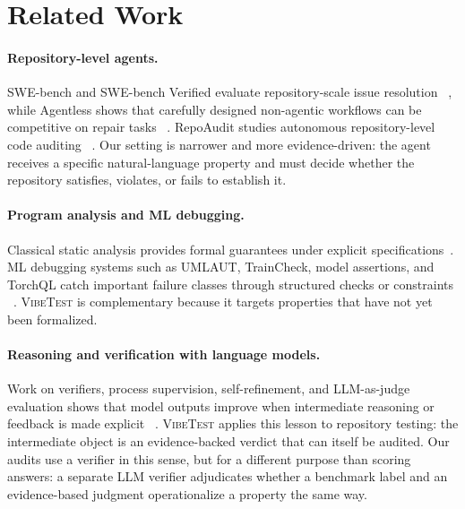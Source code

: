 \documentclass[11pt]{article}
\newcommand{\vibetest}{\textsc{VibeTest}}
\begin{document}
\section{Related Work}

\paragraph{Repository-level agents.}
SWE-bench and SWE-bench Verified evaluate repository-scale issue resolution
~\citep{jimenez2024swebench,swebench-verified}, while Agentless shows that
carefully designed non-agentic workflows can be competitive on repair tasks
~\citep{xia2024agentless}.
RepoAudit studies autonomous repository-level code auditing
~\citep{guo2025repoaudit}.
Our setting is narrower and more evidence-driven: the agent receives a specific
natural-language property and must decide whether the repository satisfies,
violates, or fails to establish it.

\paragraph{Program analysis and ML debugging.}
Classical static analysis provides formal guarantees under explicit
specifications~\citep{cousot1979systematic,nielson1999principles}.
ML debugging systems such as UMLAUT, TrainCheck, model assertions, and TorchQL
catch important failure classes through structured checks or constraints
~\citep{schoop2021umlaut,traincheck,kang2020assertions,naik2024torchql}.
\vibetest{} is complementary because it targets properties that have not yet
been formalized.

\paragraph{Reasoning and verification with language models.}
Work on verifiers, process supervision, self-refinement, and LLM-as-judge
evaluation shows that model outputs improve when intermediate reasoning or
feedback is made explicit
~\citep{cobbe2021verifier,lightman2024process,madaan2023selfrefine,weng2023selfverification,zheng2023judge,tan2025judgebench}.
\vibetest{} applies this lesson to repository testing: the intermediate object
is an evidence-backed verdict that can itself be audited.
Our audits use a verifier in this sense, but for a different purpose than
scoring answers: a separate LLM verifier adjudicates whether a benchmark label
and an evidence-based judgment operationalize a property the same way.
\end{document}
